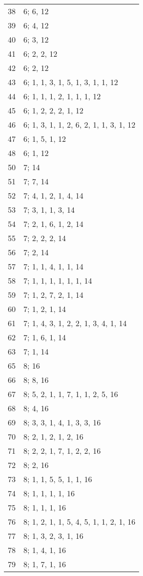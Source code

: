 \documentclass[12pt]{article}
\begin{document}
\begin{tabular}{|r|l|}
38 & 6; 6, 12 \\
39 & 6; 4, 12 \\
40 & 6; 3, 12 \\
41 & 6; 2, 2, 12 \\
42 & 6; 2, 12 \\
43 & 6; 1, 1, 3, 1, 5, 1, 3, 1, 1, 12 \\
44 & 6; 1, 1, 1, 2, 1, 1, 1, 12 \\
45 & 6; 1, 2, 2, 2, 1, 12 \\
46 & 6; 1, 3, 1, 1, 2, 6, 2, 1, 1, 3, 1, 12 \\
47 & 6; 1, 5, 1, 12 \\
48 & 6; 1, 12 \\
50 & 7; 14 \\
51 & 7; 7, 14 \\
52 & 7; 4, 1, 2, 1, 4, 14 \\
53 & 7; 3, 1, 1, 3, 14 \\
54 & 7; 2, 1, 6, 1, 2, 14 \\
55 & 7; 2, 2, 2, 14 \\
56 & 7; 2, 14 \\
57 & 7; 1, 1, 4, 1, 1, 14 \\
58 & 7; 1, 1, 1, 1, 1, 1, 14 \\
59 & 7; 1, 2, 7, 2, 1, 14 \\
60 & 7; 1, 2, 1, 14 \\
61 & 7; 1, 4, 3, 1, 2, 2, 1, 3, 4, 1, 14 \\
62 & 7; 1, 6, 1, 14 \\
63 & 7; 1, 14 \\
65 & 8; 16 \\
66 & 8; 8, 16 \\
67 & 8; 5, 2, 1, 1, 7, 1, 1, 2, 5, 16 \\
68 & 8; 4, 16 \\
69 & 8; 3, 3, 1, 4, 1, 3, 3, 16 \\
70 & 8; 2, 1, 2, 1, 2, 16 \\
71 & 8; 2, 2, 1, 7, 1, 2, 2, 16 \\
72 & 8; 2, 16 \\
73 & 8; 1, 1, 5, 5, 1, 1, 16 \\
74 & 8; 1, 1, 1, 1, 16 \\
75 & 8; 1, 1, 1, 16 \\
76 & 8; 1, 2, 1, 1, 5, 4, 5, 1, 1, 2, 1, 16 \\
77 & 8; 1, 3, 2, 3, 1, 16 \\
78 & 8; 1, 4, 1, 16 \\
79 & 8; 1, 7, 1, 16 \\

\end{tabular}
\end{document}
